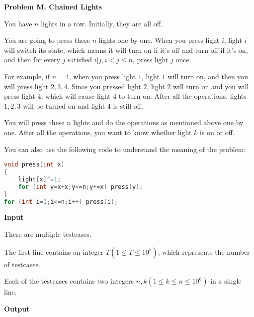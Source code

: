 \documentclass[a4paper]{article}
\begin{document}
\newpage


\textbf{\Large\textsf{Problem M. Chained Lights}}
\vspace{0.01\textheight}

You have $n$ lights in a row. Initially, they are all off.
    
    
    
You are going to press these $n$ lights one by one. When you press light $i$, light $i$ will switch its state, which means it will turn on if it's off and turn off if it's on, and then for every $j$ satisfied $i|j,i< j\le n$, press light $j$ once.
    
    
    
For example, if $n=4$, when you press light $1$, light $1$ will turn on, and then you will press light $2,3,4$. Since you pressed light $2$, light $2$ will turn on and you will press light $4$, which will cause light 4 to turn on. After all the operations, lights $1,2,3$ will be turned on and light $4$ is still off.
    
    
    
You will press these $n$ lights and do the operations as mentioned above one by one. After all the operations, you want to know whether light $k$ is on or off.
    
    
    
You can also use the following code to understand the meaning of the problem:

\begin{lstlisting}[language=C++, basicstyle=\ttfamily]
void press(int x)
{
    light[x]^=1;
    for (int y=x+x;y<=n;y+=x) press(y);
}
for (int i=1;i<=n;i++) press(i);
\end{lstlisting}


\vspace{0.01\textheight}
\textbf{\textsf{Input}}
\vspace{0.01\textheight}

There are multiple testcases.
    
    
    
The first line contains an integer $T(1\le T\le10^5)$, which represents the number of testcases.
    
    
    
Each of the testcases contains two integers $n,k(1\le k\le n\le10^6)$ in a single line.

\vspace{0.01\textheight}
\textbf{\textsf{Output}}
\vspace{0.01\textheight}
\end{document}
